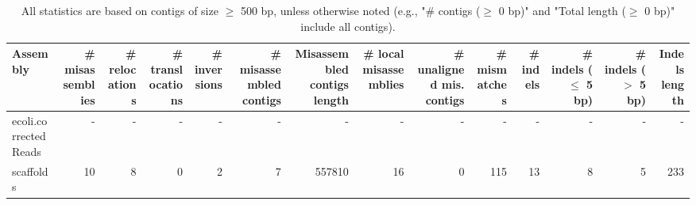 \documentclass[12pt,a4paper]{article}
\begin{document}
\begin{table}[ht]
\begin{center}
\caption{All statistics are based on contigs of size $\geq$ 500 bp, unless otherwise noted (e.g., "\# contigs ($\geq$ 0 bp)" and "Total length ($\geq$ 0 bp)" include all contigs).}
\begin{tabular}{|l*{13}{|r}|}
\hline
Assembly & \# misassemblies &     \# relocations &     \# translocations &     \# inversions & \# misassembled contigs & Misassembled contigs length & \# local misassemblies & \# unaligned mis. contigs & \# mismatches & \# indels &     \# indels ($\leq$ 5 bp) &     \# indels ($>$ 5 bp) & Indels length \\ \hline
ecoli.correctedReads & - & - & - & - & - & - & - & - & - & - & - & - & - \\ \hline
scaffolds & 10 & 8 & 0 & 2 & 7 & 557810 & 16 & 0 & 115 & 13 & 8 & 5 & 233 \\ \hline
\end{tabular}
\end{center}
\end{table}
\end{document}
